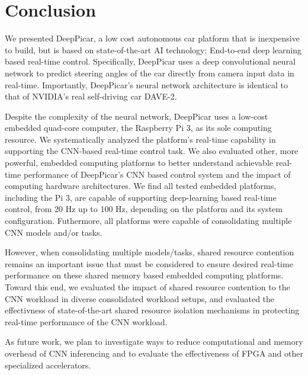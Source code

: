 \section{Conclusion}\label{sec:conclusion}
We presented DeepPicar, a low cost autonomous car platform that is
inexpensive to build, but is based on state-of-the-art AI technology:
End-to-end deep learning based real-time control.
Specifically, DeepPicar uses a deep convolutional neural network to
predict steering angles of the car directly from camera input data
in real-time. Importantly, DeepPicar's neural network architecture is
identical to that of NVIDIA's real self-driving car DAVE-2. 

Despite the complexity of the neural network, DeepPicar uses a
low-cost embedded quad-core computer, the Raspberry Pi 3,  as its sole
computing resource.
We systematically analyzed the platform's real-time capability in
supporting the CNN-based real-time control task.
We also evaluated other, more powerful, embedded computing
platforms to better understand achievable real-time performance of
DeepPicar's CNN based control system and the impact of
computing hardware architectures.
We find all tested embedded platforms, including the Pi 3, are capable
of supporting deep-learning based real-time control, from 20 Hz up to
100 Hz, depending on the platform and its system
configuration. Futhermore, all platforms were capable of consolidating
multiple CNN models and/or tasks.

However, when consolidating multiple models/tasks, shared resource
contention remains an important issue that must be considered to
ensure desired real-time performance on these shared memory based
embedded computing platforms. 
Toward this end, we evaluated the impact of shared resource contention
to the CNN workload in diverse consolidated workload setups, and
evaluated the effectivness of state-of-the-art shared resource
isolation mechanisms in protecting real-time performance of the CNN
workload.

As future work, we plan to investigate ways to reduce computational
and memory overhead of CNN inferencing and to evaluate the
effectiveness of FPGA and other specialized accelerators.


